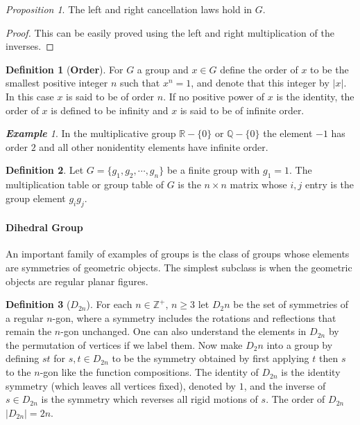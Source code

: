 \documentclass[paper=a4, fontsize=11pt]{scrartcl}
\numberwithin{equation}{section}		%
\numberwithin{figure}{section}			%
\numberwithin{table}{section}				%
\theoremstyle{definition}
\newtheorem{definition}{Definition}[section]
\theoremstyle{remark}
\theoremstyle{example}
\newtheorem{example}{\textbf{Example}}[section]
\newtheorem{prop}{Proposition}[section]
\begin{document}
\begin{prop}
    The left and right cancellation laws hold in $G$.
\end{prop}

\begin{proof}
    This can be easily proved using the left and right multiplication of the inverses.
\end{proof}

\begin{definition}[\textbf{Order}]
    For $G$ a group and $x \in G$ define the order of $x$ to be the smallest positive integer $n$ such that $x^n = 1$, and denote that this integer by $\lvert x \rvert$. In this case $x$ is said to be of order $n$. If no positive power of $x$ is the identity, the order of $x$ is defined to be infinity and $x$ is said to be of infinite order.
\end{definition}

\begin{example}
    In the multiplicative group $\mathbb{R} - \{0\}$ or $\mathbb{Q} - \{0\}$ the element $-1$ has order $2$ and all other nonidentity elements have infinite order.
\end{example}

\begin{definition}
    Let $G = \{g_1, g_2, \cdots, g_n\}$ be a finite group with $g_1 = 1$. The multiplication table or group table of $G$ is the $n \times n$ matrix whose $i,j$ entry is the group element $g_ig_j$.
\end{definition}

\paragraph{Dihedral Group}

An important family of examples of groups is the class of groups whose elements are symmetries of geometric objects. The simplest subclass is when the geometric objects are regular planar figures.

\begin{definition}[\textbf{$D_{2n}$}]
    For each $n \in \mathbb{Z}^{+}, \, n \geq 3$ let $D_2n$ be the set of symmetries of a regular $n$-gon, where a symmetry includes the rotations and reflections that remain the $n$-gon unchanged. One can also understand the elements in $D_{2n}$ by the permutation of vertices if we label them. Now make $D_2n$ into a group by defining $st$ for $s,t \in D_{2n}$ to be the symmetry obtained by first applying $t$ then $s$ to the $n$-gon like the function compositions. The identity of $D_{2n}$ is the identity symmetry (which leaves all vertices fixed), denoted by $1$, and the inverse of $s \in D_{2n}$ is the symmetry which reverses all rigid motions of $s$. The order of $D_{2n}$ $\lvert D_{2n} \rvert = 2n$.
\end{definition}
\end{document}
